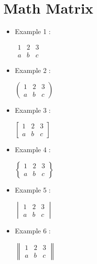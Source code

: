 \section{Math Matrix}
\begin{itemize}
  \item Example 1 :
        \par
        $\begin{matrix}
            1 & 2 & 3 \\
            a & b & c
          \end{matrix}$
        \par
  \item  Example 2 :
        \par
        $\begin{pmatrix}
            1 & 2 & 3 \\
            a & b & c
          \end{pmatrix}$
        \par
  \item  Example 3 :
        \par
        $\begin{bmatrix}
            1 & 2 & 3 \\
            a & b & c
          \end{bmatrix}$
        \par
  \item  Example 4 :
        \par
        $\begin{Bmatrix}
            1 & 2 & 3 \\
            a & b & c
          \end{Bmatrix}$
        \par
  \item  Example 5 :
        \par
        $\begin{vmatrix}
            1 & 2 & 3 \\
            a & b & c
          \end{vmatrix}$
        \par
  \item  Example 6 :
        \par
        $\begin{Vmatrix}
            1 & 2 & 3 \\
            a & b & c
          \end{Vmatrix}$
\end{itemize}
